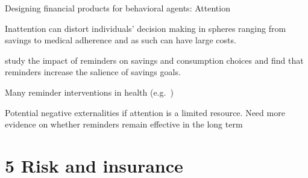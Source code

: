 \documentclass[aspectratio=169, 10pt, handout]{beamer}
\newenvironment{wideitemize}{\itemize\addtolength{\itemsep}{10pt}}{\enditemize}
\begin{document}
\begin{frame}{Designing financial products for behavioral agents: Attention}

\begin{wideitemize}

	\item Inattention can distort individuals' decision making in spheres ranging from savings to medical adherence and as such can have large costs.

	\item \cite{karlan2016getting} study the impact of reminders on savings and consumption choices and find that reminders increase the salience of savings goals.
    
    
    \item Many reminder interventions in health (e.g.\ \cite{PopEleches2011})
    

	\item Potential negative externalities if attention is a limited resource. Need more evidence on whether reminders remain effective in the long term


\end{wideitemize}


\end{frame}

\section{5 Risk and insurance}
\end{document}
